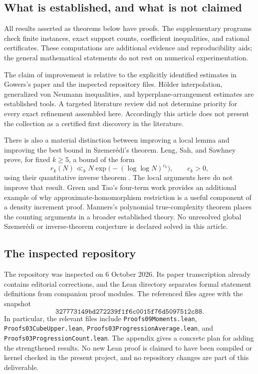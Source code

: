 \documentclass[11pt,letterpaper]{article}
\numberwithin{equation}{section}
\theoremstyle{definition}
\theoremstyle{remark}
\newcommand{\1}{\mathbf 1}
\begin{document}
\subsection{What is established, and what is not claimed}

All results asserted as theorems below have proofs.  The supplementary
programs check finite instances, exact support counts, coefficient
inequalities, and rational certificates.  These computations are additional
evidence and reproducibility aids; the general mathematical statements do
not rest on numerical experimentation.

The claim of improvement is relative to the explicitly identified
estimates in Gowers's paper and the inspected repository files.
H\"older interpolation, generalized von Neumann inequalities, and
hyperplane-arrangement estimates are established tools.  A targeted
literature review did not determine priority for every exact refinement
assembled here.  Accordingly this article does not present the collection
as a certified first discovery in the literature.

There is also a material distinction between improving a local lemma and
improving the best bound in Szemer\'edi's theorem.  Leng, Sah, and Sawhney
prove, for fixed \(k\geq5\), a bound of the form
\[
 r_k(N)\ll_k N\exp\bigl(-(\log\log N)^{c_k}\bigr),
 \qquad c_k>0,
\]
using their quantitative inverse theorem \cite{lssbounds,lssinverse}.
The local arguments here do not improve that result.  Green and Tao's
four-term work \cite{greentaofour} provides an additional example of why
approximate-homomorphism restriction is a useful component of a density
increment proof.  Manners's polynomial true-complexity theorem
\cite{manners} places the counting arguments in a broader established
theory.  No unresolved global Szemer\'edi or inverse-theorem conjecture
is declared solved in this article.

\subsection{The inspected repository}

The repository was inspected on 6 October 2026.  Its paper transcription
already contains editorial corrections, and the Lean directory separates
formal statement definitions from companion proof modules.  The referenced
files agree with the snapshot
\[
 \texttt{327773149bd272239f1f6c0015f76d5097512c88}.
\]
In particular, the relevant files include
\texttt{Proofs09Moments.lean},
\texttt{Proofs03CubeUpper.lean},
\texttt{Proofs03ProgressionAverage.lean}, and
\texttt{Proofs03ProgressionCount.lean}.
The appendix gives a concrete plan for adding the strengthened results.
No new Lean proof is claimed to have been compiled or kernel checked in
the present project, and no repository changes are part of this deliverable.
\end{document}
